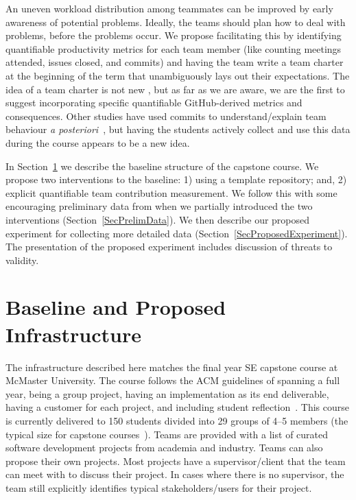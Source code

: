 \documentclass[10pt, conference]{IEEEtran}
\begin{document}
An uneven workload distribution among teammates can be improved by early
awareness of potential problems. Ideally, the teams should plan how to deal with
problems, before the problems occur.  We propose facilitating this by identifying
quantifiable productivity metrics for each team member (like counting meetings
attended, issues closed, and commits) and having the team write a team charter
at the beginning of the term that unambiguously lays out their expectations.  The
idea of a team charter is not new \cite{mathieuLayingFoundationSuccessful2009,
johnsonTeamChartersHelp2022, hughstonEmpiricalStudyTeam2013}, but as far as we
are aware, we are the first to suggest incorporating specific quantifiable
GitHub-derived metrics and consequences. Other studies have used commits to
understand/explain team behaviour \textit{a posteriori}~\cite{gitinabardStudentTeamworkProgramming2020,
tushevUsingGitHubLarge2020}, but having the students actively collect and use
this data during the course appears to be a new idea.

In Section~\ref{SecInfrastruct} we describe the baseline structure of the
capstone course.  We propose two interventions to the baseline: 1) using a
template repository; and, 2) explicit quantifiable team contribution
measurement. We follow this with some encouraging preliminary data from when we
partially introduced the two interventions (Section~\ref{SecPrelimData}).  We
then describe our proposed experiment for collecting more detailed data
(Section~\ref{SecProposedExperiment}). The presentation of the proposed
experiment includes discussion of threats to validity.

\section{Baseline and Proposed Infrastructure} \label{SecInfrastruct}

The infrastructure described here matches the final year SE capstone course at
McMaster University.
The course follows the ACM guidelines of
spanning a full year, being a group project, having an implementation as its end
deliverable, having a customer for each project, and including student
reflection~\cite{ACM2015}.  This course is currently delivered to 150 students
divided into 29 groups of 4--5 members (the typical size for capstone
courses~\cite{tenhunenSystematicLiteratureReview2023}).  Teams are provided with
a list of curated software development projects from academia and industry.
Teams can also propose their own projects.  Most projects have a
supervisor/client that the team can meet with to discuss their project.  In
cases where there is no supervisor, the team still explicitly identifies typical
stakeholders/users for their project.
\end{document}
